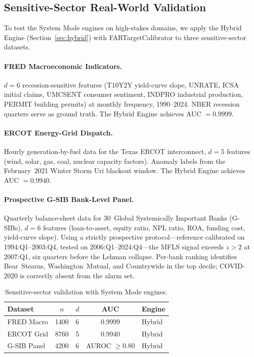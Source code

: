 \documentclass[final]{siamltex}
\begin{document}
\subsection{Sensitive-Sector Real-World Validation}\label{sec:realworld}

To test the System Mode engines on high-stakes domains, we apply
the Hybrid Engine (Section~\ref{sec:hybrid}) with
FARTargetCalibrator to three sensitive-sector datasets.

\paragraph{FRED Macroeconomic Indicators.}
$d = 6$ recession-sensitive features (T10Y2Y yield-curve slope,
UNRATE, ICSA initial claims, UMCSENT consumer sentiment, INDPRO
industrial production, PERMIT building permits) at monthly
frequency, 1990--2024.  NBER recession quarters serve as ground
truth.  The Hybrid Engine achieves AUC $= 0.9999$.

\paragraph{ERCOT Energy-Grid Dispatch.}
Hourly generation-by-fuel data \cite{ercot2023} for the Texas ERCOT interconnect,
$d = 5$ features (wind, solar, gas, coal, nuclear capacity
factors).  Anomaly labels from the February~2021 Winter Storm Uri
blackout window.  The Hybrid Engine achieves AUC $= 0.9940$.

\paragraph{Prospective G-SIB Bank-Level Panel.}
Quarterly balance-sheet data for 30~Global Systemically Important
Banks (G-SIBs), $d = 6$ features (loan-to-asset, equity ratio,
NPL ratio, ROA, funding cost, yield-curve slope).  Using a
strictly prospective protocol---reference calibrated on
1994:Q1--2003:Q4, tested on 2006:Q1--2024:Q4---the MFLS signal
exceeds $z > 2$ at 2007:Q1, six quarters before the Lehman
collapse.  Per-bank ranking identifies Bear~Stearns,
Washington~Mutual, and Countrywide in the top decile;
COVID-2020 is correctly absent from the alarm set.

\begin{table}[htbp]
\centering
\caption{Sensitive-sector validation with System Mode engines.}
\label{tab:sensitive}
\begin{tabular}{@{}lcccl@{}}
\toprule
Dataset & $n$ & $d$ & AUC & Engine\\
\midrule
FRED Macro    & 1400 & 6 & 0.9999 & Hybrid\\
ERCOT Grid    &  8760 & 5 & 0.9940 & Hybrid\\
G-SIB Panel   &  4200 & 6 & AUROC $\ge 0.80$ & Hybrid\\
\bottomrule
\end{tabular}
\end{table}
\end{document}
